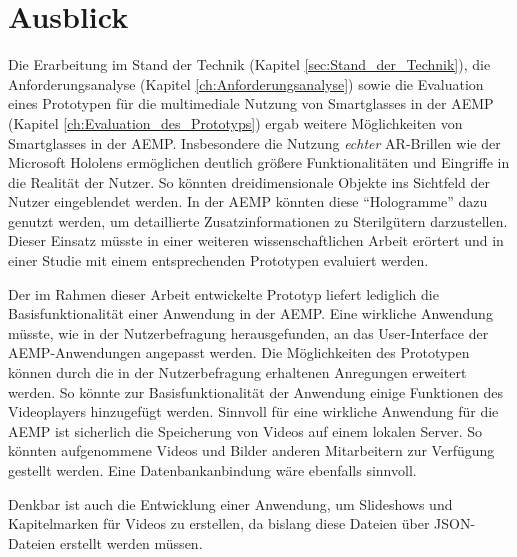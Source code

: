 %
%
%
%
%
%
\chapter{Ausblick}
\label{ch:Ausblick}
%
Die Erarbeitung im Stand der Technik (Kapitel \ref{sec:Stand_der_Technik}), die Anforderungsanalyse (Kapitel \ref{ch:Anforderungsanalyse}) sowie die Evaluation eines Prototypen für die multimediale Nutzung von Smartglasses in der AEMP (Kapitel \ref{ch:Evaluation_des_Prototyps}) ergab weitere Möglichkeiten von Smartglasses in der AEMP. Insbesondere die Nutzung \emph{echter} AR-Brillen wie der Microsoft Hololens ermöglichen deutlich größere Funktionalitäten und Eingriffe in die Realität der Nutzer. So könnten dreidimensionale Objekte ins Sichtfeld der Nutzer eingeblendet werden. In der AEMP könnten diese \enquote{Hologramme} dazu genutzt werden, um detaillierte Zusatzinformationen zu Sterilgütern darzustellen. Dieser Einsatz müsste in einer weiteren wissenschaftlichen Arbeit erörtert und in einer Studie mit einem entsprechenden Prototypen evaluiert werden.

Der im Rahmen dieser Arbeit entwickelte Prototyp liefert lediglich die Basisfunktionalität einer Anwendung in der AEMP. Eine wirkliche Anwendung müsste, wie in der Nutzerbefragung herausgefunden, an das User-Interface der AEMP-Anwendungen angepasst werden. Die Möglichkeiten des Prototypen können durch die in der Nutzerbefragung erhaltenen Anregungen erweitert werden. So könnte zur Basisfunktionalität der Anwendung einige Funktionen des Videoplayers hinzugefügt werden. Sinnvoll für eine wirkliche Anwendung für die AEMP ist sicherlich die Speicherung von Videos auf einem lokalen Server. So könnten aufgenommene Videos und Bilder anderen Mitarbeitern zur Verfügung gestellt werden. Eine Datenbankanbindung wäre ebenfalls sinnvoll. 

Denkbar ist auch die Entwicklung einer Anwendung, um Slideshows und Kapitelmarken für Videos zu erstellen, da bislang diese Dateien über JSON-Dateien erstellt werden müssen.
%
